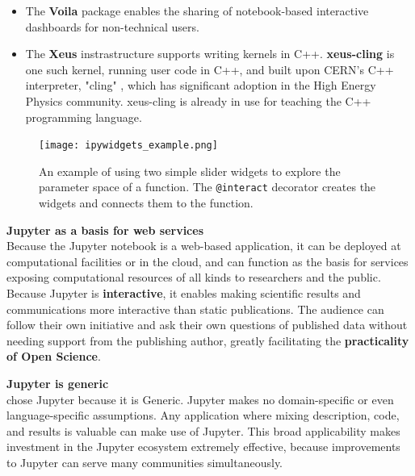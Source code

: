 \begin{itemize}
  \item The \textbf{Voila} package \cite{Voila} enables the
  sharing of notebook-based interactive dashboards for non-technical users.

  \item The \textbf{Xeus} instrastructure \cite{Corlay2017} supports writing kernels
  in C++. \textbf{xeus-cling} is one such kernel, running user code in C++,
  and built upon CERN's C++ interpreter, "cling" \cite{Vassilev2012},
  which has significant adoption in the High Energy Physics community.
  xeus-cling is already in use for teaching the C++ programming language.
\end{itemize}

\begin{figure}[ht]\centering
  \texttt{[image: ipywidgets\_example.png]}
  \caption{An example of using two simple slider widgets to explore the
  parameter space of a function. The \texttt{@interact} decorator creates
  the widgets and connects them to the function.}
  \label{fig:ipywidgets-example}
\end{figure}

\medskip
\noindent\textbf{Jupyter as a basis for web services}\\
Because the Jupyter notebook is a web-based application, it can be
deployed at computational facilities or in the cloud, and can function
as the basis for services exposing computational resources of all
kinds to researchers and the public.  Because Jupyter is
\textbf{interactive}, it enables making scientific results and
communications more interactive than static publications.  The
audience can follow their own initiative and ask their own questions
of published data without needing support from the publishing author,
greatly facilitating the \textbf{practicality of Open Science}.

\medskip
\noindent\textbf{Jupyter is generic}\\
\TheProject chose Jupyter because it is
Generic.  Jupyter makes no domain-specific or even language-specific
assumptions.  Any application where mixing description, code, and
results is valuable can make use of Jupyter.  This broad applicability
makes investment in the Jupyter ecosystem extremely effective, because
improvements to Jupyter can serve many communities simultaneously.

